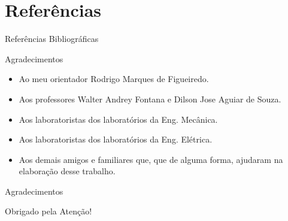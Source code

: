 \documentclass{beamer}
\begin{document}

\section{Referências}
\begin{frame}{Referências Bibliográficas}
	
\end{frame}
        

\begin{frame}{Agradecimentos}
	\begin{itemize}
        \justifying
        	\item Ao meu orientador Rodrigo Marques de Figueiredo. 
        	\item Aos professores Walter Andrey Fontana e Dilson Jose Aguiar de Souza.
			\item Aos laboratoristas dos laboratórios da Eng. Mecânica.
			\item Aos laboratoristas dos laboratórios da Eng. Elétrica.
			\item Aos demais amigos e familiares que, que de alguma forma, ajudaram na elaboração desse trabalho.  
		\end{itemize}
	\end{frame}


\begin{frame}{Agradecimentos}
		\begin{center}
			{\Huge Obrigado pela Atenção!}
		\end{center}
\end{frame}
\end{document}
